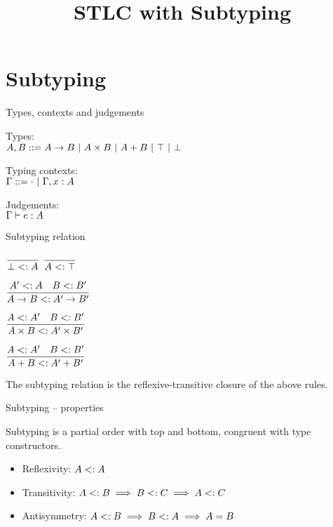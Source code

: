 \documentclass{beamer}
\title{STLC with Subtyping}
\begin{document}
\frame{\titlepage}

\section{Subtyping}

\begin{frame}{Types, contexts and judgements}

Types: \\
$A, B ::= A \to B \ |\  A \times B \ |\  A + B \ |\  \top \ |\  \bot$

\vspace{2em}

Typing contexts: \\
$\Gamma ::= \cdot \ |\  \Gamma, x : A$

\vspace{2em}

Judgements: \\
$\Gamma \vdash e : A$

\end{frame}

\begin{frame}{Subtyping relation}

\begin{center}
  $\displaystyle \frac{}{\bot <: A} \textsc{\footnotesize{}}$ \quad
  $\displaystyle \frac{}{A <: \top} \textsc{\footnotesize{}}$

  \vspace{2em}

  $\displaystyle \frac{A' <: A \quad B <: B'}{A \to B <: A' \to B'} \textsc{\footnotesize{}}$

  \vspace{2em}

  $\displaystyle \frac{A <: A' \quad B <: B'}{A \times B <: A' \times B'} \textsc{\footnotesize{}}$

  \vspace{2em}

  $\displaystyle \frac{A <: A' \quad B <: B'}{A + B <: A' + B'} \textsc{\footnotesize{}}$
\end{center}

\vspace{2em}

The subtyping relation is the reflexive-transitive closure of the above rules.

\end{frame}

\begin{frame}{Subtyping -- properties}

Subtyping is a partial order with top and bottom, congruent with type constructors.

\begin{itemize}
  \item Reflexivity: $A <: A$
  \item Transitivity: $A <: B \implies B <: C \implies A <: C$
  \item Antisymmetry: $A <: B \implies B <: A \implies A = B$
\end{itemize}

\end{frame}
\end{document}
